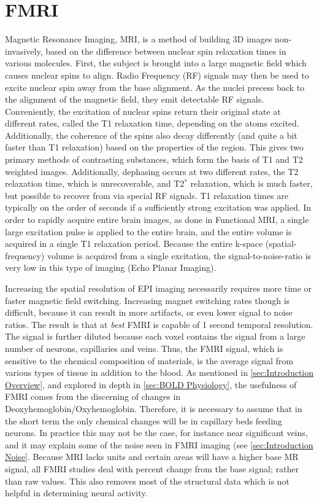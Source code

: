 \section{FMRI}
Magnetic Resonance Imaging, MRI, is a method of building 3D images
non-invasively, based on the difference between nuclear spin
relaxation times in various molecules. First, the subject 
is brought into a large magnetic field which causes nuclear spins
to align. Radio Frequency (RF) signals may
then be used to excite nuclear spin away from the base alignment. 
As the nuclei precess back to the alignment of the magnetic
field, they emit detectable RF signals. Conveniently, the
excitation of nuclear spins return their original state at different
rates, called the T1 relaxation time, depending on the atoms excited.
Additionally, the
coherence of the spins also decay differently (and quite a bit faster
than T1 relaxation) based on the properties of the region.
This gives two primary methods of contrasting substances,
which form the basis of T1 and T2 weighted images. Additionally, 
dephasing occurs at two different rates, the T2 relaxation time,
which is unrecoverable, and T2$^*$ relaxation, which is
much faster, but possible to recover from via special RF signals.
T1 relaxation times are typically on the order of seconds if 
a sufficiently strong excitation was applied. 
In order to rapidly acquire entire brain images, as done in Functional 
MRI, a single large excitation pulse is applied to the entire brain,
and the entire volume is acquired in a single T1 relaxation period. 
Because the entire k-space (spatial-frequency) volume is acquired 
from a single excitation, the signal-to-noise-ratio is very low
in this type of imaging (Echo Planar Imaging). 

Increasing the spatial resolution of EPI imaging necessarily 
requires more time or faster magnetic field switching. Increasing
magnet switching rates though is difficult, because it can result in
more artifacts, or even lower signal to noise ratios. The result is
that at \emph{best} FMRI is capable of 1 second temporal resolution. 
The signal is further diluted because each voxel contains
the signal from a large number of neurons, capillaries and veins. 
Thus, the FMRI signal, which is sensitive to the chemical composition of 
materials, is the average signal from various types of tissue
in addition to the blood. As mentioned in \autoref{sec:Introduction Overview},
and explored in depth in \autoref{sec:BOLD Physiology},
the usefulness of FMRI comes from the discerning of changes in 
Deoxyhemoglobin/Oxyhemoglobin. Therefore, it is necessary to assume
that in the short term the only chemical changes will be in
capillary beds feeding neurons. In practice this may not be the case, for
instance near significant veins, and it may explain some of the
noise seen in FMRI imaging (see \autoref{sec:Introduction Noise}. 
Because MRI lacks units and certain
areas will have a higher base MR signal, all FMRI studies deal with
percent change from the base signal; rather than raw values. This
also removes most of the structural data which is not helpful 
in determining neural activity.

